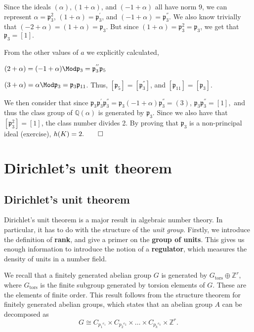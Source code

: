 \documentclass[a4paper, 12pt,oneside,openany]{book}
\begin{document}
{    Since the ideals $(\alpha), (1+\alpha)$, and $(-1+\alpha)$ all have norm $9$, we can represent $\alpha=\mathfrak{p}_3^2$, $(1+\alpha)=\mathfrak{p}_3^{'}$, and $(-1+\alpha)=\mathfrak{p}_3^{''}.$ We also know trivially that $(-2+\alpha)=(1+\alpha)=\mathfrak{p}_3.$ But since $(1+\alpha)=\mathfrak{p}_3^2=\mathfrak{p}_3$, we get that $\mathfrak{p}_3=[1].$
    
    From the other values of $a$ we explicitly calculated,
    
    $(2+\alpha) = (-1+\alpha) \Mod \mathfrak{p}_3 = \mathfrak{p}_3^{''} \mathfrak{p}_5$
    
    $(3+\alpha)=\alpha \Mod \mathfrak{p}_3=\mathfrak{p}_3\mathfrak{p}_{11}$. Thus, $[\mathfrak{p}_5]=[\mathfrak{p}_3^{''}]$, and $[\mathfrak{p}_{11}]=[\mathfrak{p}_3]$.
    
    We then consider that since $\mathfrak{p}_3\mathfrak{p}_3^{'}\mathfrak{p}_3^{''}=\mathfrak{p}_3(-1+\alpha)\mathfrak{p}_3^{''}=(3)$, $\mathfrak{p}_3\mathfrak{p}_3^{''}=[1],$ and thus the class group of $\mathbb{Q}(\alpha)$ is generated by $\mathfrak{p}_3.$ Since we also have that $[\mathfrak{p}_3^2]=[1]$, the class number divides 2. By proving that $\mathfrak{p}_3$ is a non-principal ideal (exercise), $h(K)=2. \qed$ 
}

\chapter{Dirichlet's unit theorem}

\section{Dirichlet's unit theorem}

Dirichlet's unit theorem is a major result in algebraic number theory. In particular, it has to do with the structure of the \emph{unit group}. Firstly, we introduce the definition of \textbf{rank}, and give a primer on the \textbf{group of units}. This gives us enough information to introduce the notion of a \textbf{regulator}, which measures the density of units in a number field. 

We recall that a finitely generated abelian group $G$ is generated by $G_{\text{tors}} \oplus \mathbb{Z}^r$, where $G_{\text{tors}}$ is the finite subgroup generated by torsion elements of $G$. These are the elements of finite order. This result follows from the structure theorem for finitely generated abelian groups, which states that an abelian group $A$ can be decomposed as $$G \cong C_{{p_1}^{e_1}} \times C_{{p_2}^{e_2}} \times \dots \times C_{{p_k}^{e_k}} \times \mathbb{Z}^r.$$
\end{document}

